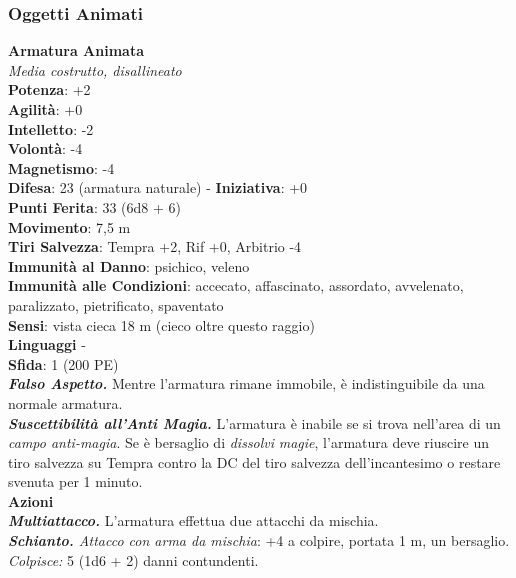 \begin{multicols}{2}
\subsubsection{Oggetti Animati}

\medskip\textbf{Armatura Animata}\\
\emph{Media costrutto, disallineato}\\
\textbf{Potenza}: +2\\
\textbf{Agilità}: +0\\
\textbf{Intelletto}: -2\\
\textbf{Volontà}: -4\\
\textbf{Magnetismo}: -4\\
\textbf{Difesa}: 23 (armatura naturale) - \textbf{Iniziativa}: +0\\
\textbf{Punti Ferita}: 33 (6d8 + 6)\\
\textbf{Movimento}: 7,5 m\\
\textbf{Tiri Salvezza}: Tempra +2, Rif +0, Arbitrio -4\\
\textbf{Immunità al Danno}: psichico, veleno\\
\textbf{Immunità alle Condizioni}: accecato, affascinato, assordato, avvelenato, paralizzato, pietrificato, spaventato \\
\textbf{Sensi}: vista cieca 18 m (cieco oltre questo raggio)\\
\textbf{Linguaggi} -\\
\textbf{Sfida}: 1 (200 PE)\smallskip\\
\emph{\textbf{Falso Aspetto.}} Mentre l'armatura rimane immobile, è indistinguibile da una normale armatura.\\
\emph{\textbf{Suscettibilità all'Anti Magia.}} L'armatura è inabile se si trova nell'area di un \emph{campo anti-magia}. Se è bersaglio di \emph{dissolvi} \emph{magie}, l'armatura deve riuscire un tiro salvezza su Tempra contro la DC del tiro salvezza dell'incantesimo o restare svenuta per 1 minuto.\\
\smallskip\textbf{Azioni}\\
\emph{\textbf{Multiattacco.}} L'armatura effettua due attacchi da mischia.\\
\emph{\textbf{Schianto.} Attacco con arma da mischia}: +4 a colpire, portata 1 m, un bersaglio.\\
\emph{Colpisce:} 5 (1d6 + 2) danni contundenti.\\


\end{multicols}
